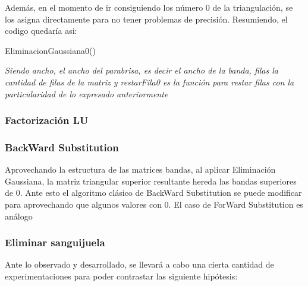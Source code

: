 Además, en el momento de ir consiguiendo los número 0 de la triangulación, se los asigna directamente para no tener problemas de precisión. Resumiendo, el codigo quedaría asi:\\
 \begin{algorithm}[H]
\caption{EliminacionGaussiana0()}
\begin{algorithmic}[1]

    
    $}
    
        \State coeficiente = (Obtener(i,j)/Obtener(j,j));
		\State RestarFila0(coeficiente, j, i, j+1);
		
	\EndFor 
    \State cerosAIzquierda(j,j);
	
	\EndFor
	
\end{algorithmic}
\end{algorithm}
\textit{Siendo ancho, el ancho del parabrisa, es decir el ancho de la banda, filas la cantidad de filas de la matriz y restarFila0 es la función para restar filas con la particularidad de lo expresado anteriormente}
	
	

















\subsubsection{Factorización LU}

\subsubsection{BackWard Substitution}
Aprovechando la estructura de las matrices bandas, al aplicar Eliminación Gaussiana, la matriz triangular superior resultante hereda las bandas superiores de 0. Ante esto el algoritmo clásico de BackWard Substitution se puede modificar para aprovechando que algunos valores con 0. El caso de ForWard Substitution es análogo


\subsubsection{Eliminar sanguijuela}
Ante lo observado y desarrollado, se llevará a cabo una cierta cantidad de experimentaciones para poder contrastar las siguiente  hipótesis:\\

